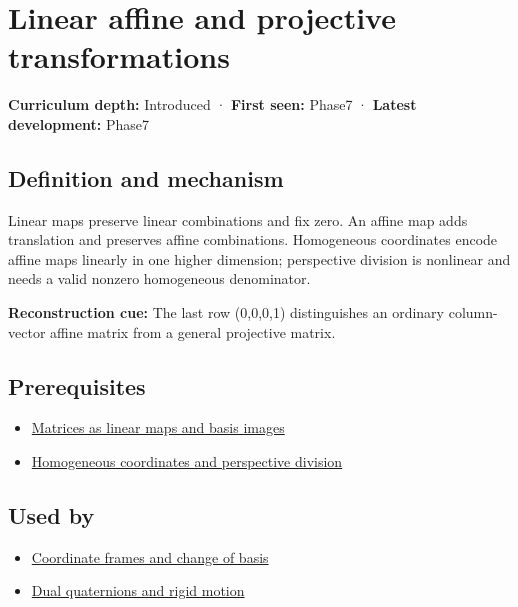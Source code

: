 \hypertarget{appendix-0bf0ca73f735}{}\label{referencestart:appendix-0bf0ca73f735}
\section{Linear affine and projective transformations}\label{appendix-0bf0ca73f735-linear-affine-and-projective-transformations}

\textbf{Curriculum depth:} Introduced · \textbf{First seen:} Phase7 · \textbf{Latest development:} Phase7

\subsection{Definition and mechanism}\label{appendix-0bf0ca73f735-definition-and-mechanism}

Linear maps preserve linear combinations and fix zero. An affine map adds translation and preserves affine combinations. Homogeneous coordinates encode affine maps linearly in one higher dimension; perspective division is nonlinear and needs a valid nonzero homogeneous denominator.

\textbf{Reconstruction cue:} The last row (0,0,0,1) distinguishes an ordinary column-vector affine matrix from a general projective matrix.

\subsection{Prerequisites}\label{appendix-0bf0ca73f735-prerequisites}

\begin{itemize}
\tightlist
\item
  \hyperref[appendix-bd39c3bf5d64]{Matrices as linear maps and basis images}
\item
  \hyperref[appendix-cb3b26862282]{Homogeneous coordinates and perspective division}
\end{itemize}

\subsection{Used by}\label{appendix-0bf0ca73f735-used-by}

\begin{itemize}
\tightlist
\item
  \hyperref[appendix-1bae9457dbc3]{Coordinate frames and change of basis}
\item
  \hyperref[appendix-d1ea57347893]{Dual quaternions and rigid motion}
\end{itemize}

